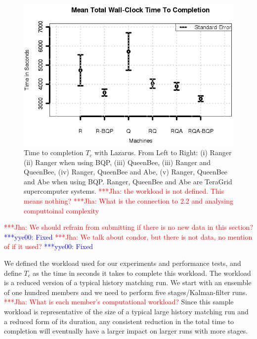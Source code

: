 \documentclass{acm_proc_article-sp}
\newcommand{\tc}{$T_c$ }
\newcommand{\jhanote}[1]{ {\textcolor{red} { ***Jha: #1 }}}
\newcommand{\yyenote}[1]{ {\textcolor{blue} { ***yye00: #1 }}}
\newcommand{\jhanote}[1]{}
\newcommand{\yyenote}[1]{}
\begin{document}
\begin{figure}
\begin{center}
  \includegraphics*[scale=0.5,angle=0]{figures/Figure7.png}
\end{center}
\caption{Time to completion \tc with Lazarus. From Left to Right: (i)
  Ranger (ii) Ranger when using BQP, (iii) QueenBee, (iii) Ranger and
  QueenBee, (iv) Ranger, QueenBee and Abe, (v) Ranger, QueenBee and
  Abe when using BQP. Ranger, QueenBee and Abe are TeraGrid supercomputer
  systems. \jhanote{the workload is not defined. This means nothing?}
  \jhanote{What is the connection to 2.2 and analysing computtoinal complexity}}
\label{fig:SingleVsDistributed}
\end{figure}


\jhanote{We should refrain from submitting if there is no new data in
  this section?}\yyenote{Fixed}
\jhanote{We talk about condor, but there is not data, no mention of 
 if it used?} \yyenote{Fixed}



We defined the workload used for our experiments and performance
tests, and define \tc as the time in seconds it takes to complete this
workload. The workload is a reduced version of a typical history
matching run. We start with an ensemble of one hundred members and we
need to perform five stages/Kalman-filter runs. \jhanote{What is each
  member's computational workload?} Since this sample workload is
representative of the size of a typical large history matching run and
a reduced form of its duration, any consistent reduction in the total
time to completion will eventually have a larger impact on larger runs
with more stages.
\end{document}
